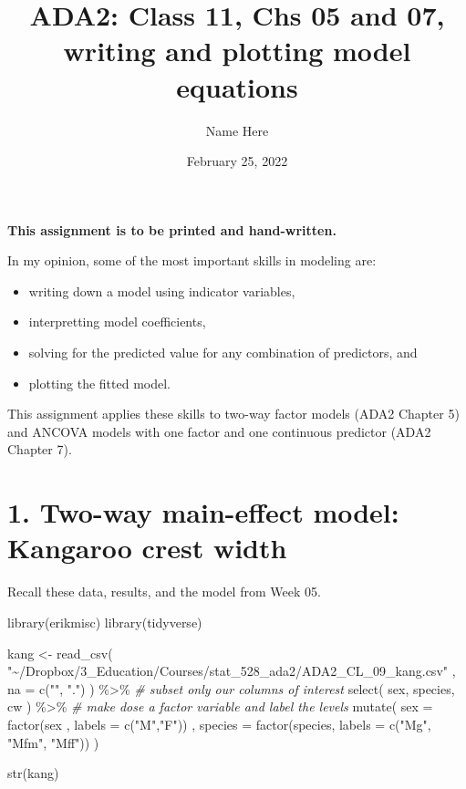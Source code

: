 \documentclass[
  12pt,
]{article}
\title{ADA2: Class 11, Chs 05 and 07, writing and plotting model
equations}
\author{Name Here}
\date{February 25, 2022}
\newenvironment{Shaded}{\begin{snugshade}}{\end{snugshade}}
\newcommand{\AttributeTok}[1]{\textcolor[rgb]{0.77,0.63,0.00}{#1}}
\newcommand{\CommentTok}[1]{\textcolor[rgb]{0.56,0.35,0.01}{\textit{#1}}}
\newcommand{\FunctionTok}[1]{\textcolor[rgb]{0.00,0.00,0.00}{#1}}
\newcommand{\NormalTok}[1]{#1}
\newcommand{\OtherTok}[1]{\textcolor[rgb]{0.56,0.35,0.01}{#1}}
\newcommand{\SpecialCharTok}[1]{\textcolor[rgb]{0.00,0.00,0.00}{#1}}
\newcommand{\StringTok}[1]{\textcolor[rgb]{0.31,0.60,0.02}{#1}}
\providecommand{\tightlist}{%
  \setlength{\itemsep}{0pt}\setlength{\parskip}{0pt}}
\begin{document}
\maketitle

\textbf{This assignment is to be printed and hand-written.}

In my opinion, some of the most important skills in modeling are:

\begin{itemize}
\tightlist
\item
  writing down a model using indicator variables,
\item
  interpretting model coefficients,
\item
  solving for the predicted value for any combination of predictors, and
\item
  plotting the fitted model.
\end{itemize}

This assignment applies these skills to two-way factor models (ADA2
Chapter 5) and ANCOVA models with one factor and one continuous
predictor (ADA2 Chapter 7).

\hypertarget{two-way-main-effect-model-kangaroo-crest-width}{%
\section{1. Two-way main-effect model: Kangaroo crest
width}\label{two-way-main-effect-model-kangaroo-crest-width}}

Recall these data, results, and the model from Week 05.

\begin{Shaded}
\begin{Highlighting}[]
\FunctionTok{library}\NormalTok{(erikmisc)}
\FunctionTok{library}\NormalTok{(tidyverse)}

\NormalTok{kang }\OtherTok{\textless{}{-}}
  \FunctionTok{read\_csv}\NormalTok{(}
    \StringTok{"\textasciitilde{}/Dropbox/3\_Education/Courses/stat\_528\_ada2/ADA2\_CL\_09\_kang.csv"}
\NormalTok{  , }\AttributeTok{na =} \FunctionTok{c}\NormalTok{(}\StringTok{""}\NormalTok{, }\StringTok{"."}\NormalTok{)}
\NormalTok{  ) }\SpecialCharTok{\%\textgreater{}\%}
  \CommentTok{\# subset only our columns of interest}
  \FunctionTok{select}\NormalTok{(}
\NormalTok{    sex, species, cw}
\NormalTok{  ) }\SpecialCharTok{\%\textgreater{}\%}
  \CommentTok{\# make dose a factor variable and label the levels}
  \FunctionTok{mutate}\NormalTok{(}
    \AttributeTok{sex     =} \FunctionTok{factor}\NormalTok{(sex    , }\AttributeTok{labels =} \FunctionTok{c}\NormalTok{(}\StringTok{"M"}\NormalTok{,}\StringTok{"F"}\NormalTok{))}
\NormalTok{  , }\AttributeTok{species =} \FunctionTok{factor}\NormalTok{(species, }\AttributeTok{labels =} \FunctionTok{c}\NormalTok{(}\StringTok{"Mg"}\NormalTok{, }\StringTok{"Mfm"}\NormalTok{, }\StringTok{"Mff"}\NormalTok{))}
\NormalTok{  )}

\FunctionTok{str}\NormalTok{(kang)}
\end{Highlighting}
\end{Shaded}
\end{document}
